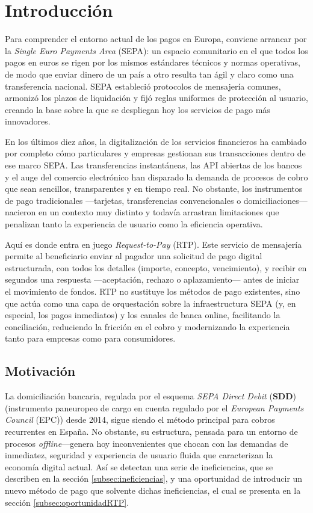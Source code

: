 \section{Introducción}
\label{sec:Introduccion}

Para comprender el entorno actual de los pagos en Europa, conviene arrancar por la \emph{Single Euro Payments Area} (SEPA): un espacio comunitario en el que todos los pagos en euros se rigen por los mismos estándares técnicos y normas operativas, de modo que enviar dinero de un país a otro resulta tan ágil y claro como una transferencia nacional\cite{ecb_sepa}. SEPA estableció protocolos de mensajería comunes, armonizó los plazos de liquidación y fijó reglas uniformes de protección al usuario, creando la base sobre la que se despliegan hoy los servicios de pago más innovadores.

En los últimos diez años, la digitalización de los servicios financieros ha cambiado por completo cómo particulares y empresas gestionan sus transacciones dentro de ese marco SEPA. Las transferencias instantáneas, las API abiertas de los bancos y el auge del comercio electrónico han disparado la demanda de procesos de cobro que sean sencillos, transparentes y en tiempo real. No obstante, los instrumentos de pago tradicionales —tarjetas, transferencias convencionales o domiciliaciones— nacieron en un contexto muy distinto y todavía arrastran limitaciones que penalizan tanto la experiencia de usuario como la eficiencia operativa.

Aquí es donde entra en juego \emph{Request-to-Pay} (RTP). Este servicio de mensajería permite al beneficiario enviar al pagador una solicitud de pago digital estructurada, con todos los detalles (importe, concepto, vencimiento), y recibir en segundos una respuesta —aceptación, rechazo o aplazamiento— antes de iniciar el movimiento de fondos. RTP no sustituye los métodos de pago existentes, sino que actúa como una capa de orquestación sobre la infraestructura SEPA (y, en especial, los pagos inmediatos) y los canales de banca online, facilitando la conciliación, reduciendo la fricción en el cobro y modernizando la experiencia tanto para empresas como para consumidores.

\subsection{Motivación}
\label{subsec:Motivacion}

La domiciliación bancaria, regulada por el esquema \textit{SEPA Direct Debit} (\textbf{SDD})\cite{epc_sdd_2025} (instrumento paneuropeo de cargo en cuenta regulado por el \emph{European Payments Council} (EPC)) desde 2014, sigue siendo el método principal para cobros recurrentes en España. No obstante, su estructura, pensada para un entorno de procesos \emph{offline}—genera hoy inconvenientes que chocan con las demandas de inmediatez, seguridad y experiencia de usuario fluida que caracterizan la economía digital actual. Así se detectan una serie de ineficiencias, que se describen en la sección \ref{subsec:ineficiencias}, y una oportunidad de introducir un nuevo método de pago que solvente dichas ineficiencias, el cual se presenta en la sección \ref{subsec:oportunidadRTP}.


